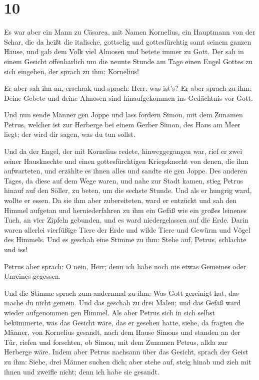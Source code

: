 \hypertarget{section-9}{%
\section{10}\label{section-9}}

 Es war aber ein Mann zu Cäsarea, mit Namen Kornelius, ein
Hauptmann von der Schar, die da heißt die italische, 
gottselig und gottesfürchtig samt seinem ganzen Hause, und gab dem Volk
viel Almosen und betete immer zu Gott.  Der sah in einem
Gesicht offenbarlich um die neunte Stunde am Tage einen Engel Gottes zu
sich eingehen, der sprach zu ihm: Kornelius!

 Er aber sah ihn an, erschrak und sprach: Herr, was ist's?
Er aber sprach zu ihm: Deine Gebete und deine Almosen sind
hinaufgekommen ins Gedächtnis vor Gott.

 Und nun sende Männer gen Joppe und lass fordern Simon,
mit dem Zunamen Petrus,  welcher ist zur Herberge bei
einem Gerber Simon, des Haus am Meer liegt; der wird dir sagen, was du
tun sollst.

 Und da der Engel, der mit Kornelius redete,
hinweggegangen war, rief er zwei seiner Hausknechte und einen
gottesfürchtigen Kriegsknecht von denen, die ihm aufwarteten,
 und erzählte es ihnen alles und sandte sie gen Joppe.
 Des anderen Tages, da diese auf dem Wege waren, und nahe
zur Stadt kamen, stieg Petrus hinauf auf den Söller, zu beten, um die
sechste Stunde.  Und als er hungrig ward, wollte er
essen. Da sie ihm aber zubereiteten, ward er entzückt 
und sah den Himmel aufgetan und herniederfahren zu ihm ein Gefäß wie ein
großes leinenes Tuch, an vier Zipfeln gebunden, und es ward
niedergelassen auf die Erde.  Darin waren allerlei
vierfüßige Tiere der Erde und wilde Tiere und Gewürm und Vögel des
Himmels.  Und es geschah eine Stimme zu ihm: Stehe auf,
Petrus, schlachte und iss!

 Petrus aber sprach: O nein, Herr; denn ich habe noch nie
etwas Gemeines oder Unreines gegessen.

 Und die Stimme sprach zum andernmal zu ihm: Was Gott
gereinigt hat, das mache du nicht gemein.  Und das
geschah zu drei Malen; und das Gefäß ward wieder aufgenommen gen Himmel.
 Als aber Petrus sich in sich selbst bekümmerte, was das
Gesicht wäre, das er gesehen hatte, siehe, da fragten die Männer, von
Kornelius gesandt, nach dem Hause Simons und standen an der Tür,
 riefen und forschten, ob Simon, mit dem Zunamen Petrus,
allda zur Herberge wäre.  Indem aber Petrus nachsann über
das Gesicht, sprach der Geist zu ihm: Siehe, drei Männer suchen dich;
 aber stehe auf, steig hinab und zieh mit ihnen und
zweifle nicht; denn ich habe sie gesandt.

